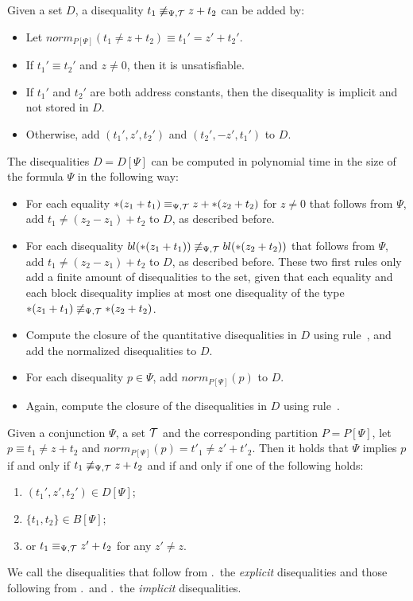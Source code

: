 Given a set $D$, a disequality $t_1 \not\equiv_{\Psi,\mathcal{T}} z + t_2$ can be added by:
\begin{itemize}
\item Let $norm_{P[\Psi]}(t_1 \neq z + t_2) \equiv t_1' = z' + t_2'$.
\item If $t_1' \equiv t_2'$ and $z \neq 0$, then it is unsatisfiable.
\item If $t_1'$ and $t_2'$ are both address constants, then the disequality is implicit and not stored in $D$.
\item Otherwise, add $(t_1', z', t_2')$ and $(t_2', -z', t_1')$ to $D$.
\end{itemize}

The disequalities $D = D[\Psi]$ can be computed in polynomial time in the size of the formula $\Psi$ in the following way:

\begin{itemize}
    \item\label{item:diseq-equalities} For each equality $*(z_1 + t_1) \equiv_{\Psi,\mathcal{T}} z + *(z_2 + t_2)$ for $z \neq 0$
          that follows from $\Psi$,
          add $t_1 \neq (z_2 - z_1) + t_2$ to $D$, as described before.
    \item\label{item:diseq-bldiseq} For each disequality $bl(*(z_1 + t_1)) \not\equiv_{\Psi,\mathcal{T}} bl(*(z_2 + t_2))$ that follows from $\Psi$, add $t_1 \neq (z_2 - z_1) + t_2$ to $D$, as described before.
          These two first rules only add a finite amount of disequalities to the set, given that each equality and each block disequality implies at most one disequality of the type $*(z_1 + t_1) \not\equiv_{\Psi,\mathcal{T}} *(z_2 + t_2)$.
    \item Compute the closure of the quantitative disequalities in $D$ using rule~, and add the normalized disequalities to $D$.
    \item For each disequality $p \in \Psi$, add $norm_{P[\Psi]}(p)$ to $D$.
    \item Again, compute the closure of the disequalities in $D$ using rule~.
\end{itemize}

Given a conjunction $\Psi$, a set $\mathcal{T}$ and the corresponding partition $P = P[\Psi]$, let $p \equiv t_1 \neq z + t_2$ and $norm_{P[\Psi]}(p) = t'_1 \neq z' + t'_2$.
Then
it holds that $\Psi$ implies $p$ if and only if $t_1 \not\equiv_{\Psi,\mathcal{T}} z + t_2$ and if and only if one of the following holds:

\begin{enumerate}
    \item\label{item:diseqs-d} $(t_1',z', t_2') \in D[\Psi]$;
    \item\label{item:bl-diseqs} $\{t_1,t_2\} \in B[\Psi]$;
    \item\label{item:eqs-d} or $t_1 \equiv_{\Psi,\mathcal{T}} z' + t_2$ for any $z' \neq z$.
\end{enumerate}
We call the disequalities that follow from .\ the \emph{explicit} disequalities and those following from .\ and .\ the \emph{implicit} disequalities.

